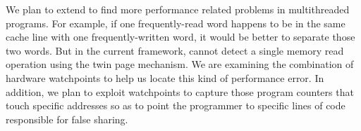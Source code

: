 \label{sec:future}
\label{futurework}

We plan to extend \sheriff{} to find more performance related problems in
multithreaded programs. For example, if one frequently-read word
happens to be in the same cache line with one frequently-written word,
it would be better to separate those two words. But in the current
framework, \sheriff{} cannot detect a single memory read operation using the
twin page mechanism. We are examining the combination of hardware
watchpoints to help us locate this kind of performance error. In
addition, we plan to exploit watchpoints to capture those program
counters that touch specific addresses so as to point the programmer
to specific lines of code responsible for false sharing.


